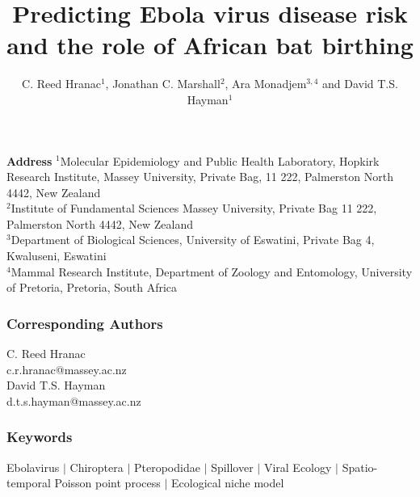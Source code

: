 \documentclass[a4paper,twoside, onecolumn]{article}
\title{Predicting Ebola virus disease risk and the role of African bat birthing}
\author{%
	C. Reed Hranac$^{1}$, Jonathan C. Marshall$^{2}$, Ara Monadjem$^{3, 4}$ and David T.S. Hayman$^{1}$}
\begin{document}
	
	\maketitle
	\begin{center}
		\textbf{Address}
		$^{1}$Molecular Epidemiology and Public Health Laboratory, Hopkirk Research Institute, Massey University, Private Bag, 11 222, Palmerston North 4442, New Zealand\\
		$^{2}$Institute of Fundamental Sciences Massey University, Private Bag 11 222, Palmerston North 4442, New Zealand\\
		$^{3}$Department of Biological Sciences, University of Eswatini, Private Bag 4, Kwaluseni, Eswatini\\
		$^{4}$Mammal Research Institute, Department of Zoology and Entomology, University of Pretoria, Pretoria, South Africa
	\end{center}
	\subsubsection*{Corresponding Authors}
	C. Reed Hranac\\
	c.r.hranac@massey.ac.nz\\
	David T.S. Hayman\\
	d.t.s.hayman@massey.ac.nz\\
	\newpage\clearpage
	
	\subsubsection*{Keywords}
	Ebolavirus $|$ Chiroptera $|$ Pteropodidae $|$ Spillover $|$ Viral Ecology $|$ Spatio-temporal Poisson point process $|$ Ecological niche model
	
\end{document}
